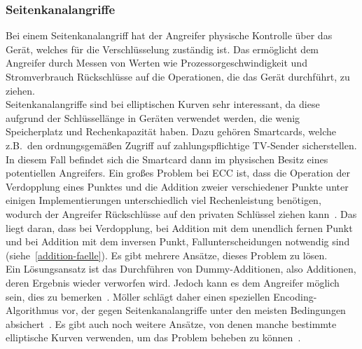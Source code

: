 \documentclass[hidelinks]{article}
\theoremstyle{plain}
\theoremstyle{definition}
\theoremstyle{rem}
\begin{document}
\begin{sloppypar}
\subsubsection{Seitenkanalangriffe}
Bei einem Seitenkanalangriff hat der Angreifer physische Kontrolle über das Gerät, welches für die Verschlüsselung zuständig ist.
Das ermöglicht dem Angreifer durch Messen von Werten wie Prozessorgeschwindigkeit und Stromverbrauch Rückschlüsse auf die Operationen, die das Gerät durchführt, zu ziehen.\\
Seitenkanalangriffe sind bei elliptischen Kurven sehr interessant, da diese aufgrund der Schlüssellänge in Geräten verwendet werden, die wenig Speicherplatz und Rechenkapazität haben. Dazu gehören Smartcards, welche z.B.\ den ordnungsgemäßen Zugriff auf zahlungspflichtige TV-Sender sicherstellen. In diesem Fall befindet sich die Smartcard dann im physischen Besitz eines potentiellen Angreifers.
Ein großes Problem bei ECC ist, dass die Operation der Verdopplung eines Punktes und die Addition zweier verschiedener Punkte unter einigen Implementierungen unterschiedlich viel Rechenleistung benötigen, wodurch der Angreifer Rückschlüsse auf den privaten Schlüssel ziehen kann~\cite{moller2001}. 
Das liegt daran, dass bei Verdopplung, bei Addition mit dem unendlich fernen Punkt und bei Addition mit dem inversen Punkt, Fallunterscheidungen notwendig sind (siehe~\ref{addition-faelle}). Es gibt mehrere Ansätze, dieses Problem zu lösen.\\
Ein Lösungsansatz ist das Durchführen von Dummy-Additionen, also Additionen, deren Ergebnis wieder verworfen wird. Jedoch kann es dem Angreifer möglich sein, dies zu bemerken~\cite{moller2001}.
Möller schlägt daher einen speziellen Encoding-Algorithmus vor, der gegen Seitenkanalangriffe unter den meisten Bedingungen absichert~\cite{moller2001}. 
Es gibt auch noch weitere Ansätze, von denen manche bestimmte elliptische Kurven verwenden, um das Problem beheben zu können~\cite{moller2001}.


\end{sloppypar}
\end{document}
